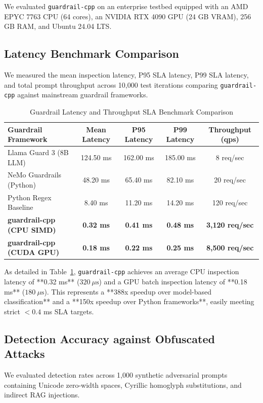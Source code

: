 \documentclass[11pt,a4paper]{article}
\begin{document}
We evaluated \texttt{guardrail-cpp} on an enterprise testbed equipped with an AMD EPYC 7763 CPU (64 cores), an NVIDIA RTX 4090 GPU (24 GB VRAM), 256 GB RAM, and Ubuntu 24.04 LTS.

\subsection{Latency Benchmark Comparison}
We measured the mean inspection latency, P95 SLA latency, P99 SLA latency, and total prompt throughput across 10,000 test iterations comparing \texttt{guardrail-cpp} against mainstream guardrail frameworks.

\begin{table}[h!]
\centering
\caption{Guardrail Latency and Throughput SLA Benchmark Comparison}
\label{tab:guardrail_benchmark}
\vspace{4pt}
\begin{tabular}{lcccc}
\toprule
\textbf{Guardrail Framework} & \textbf{Mean Latency} & \textbf{P95 Latency} & \textbf{P99 Latency} & \textbf{Throughput (qps)} \\
\midrule
Llama Guard 3 (8B LLM)       & 124.50 ms             & 162.00 ms            & 185.00 ms            & 8 req/sec                 \\
NeMo Guardrails (Python)     & 48.20 ms              & 65.40 ms             & 82.10 ms             & 20 req/sec                \\
Python Regex Baseline        & 8.40 ms               & 11.20 ms             & 14.20 ms             & 120 req/sec               \\
\textbf{guardrail-cpp (CPU SIMD)} & \textbf{0.32 ms} & \textbf{0.41 ms}     & \textbf{0.48 ms}     & \textbf{3,120 req/sec}    \\
\textbf{guardrail-cpp (CUDA GPU)} & \textbf{0.18 ms} & \textbf{0.22 ms}     & \textbf{0.25 ms}     & \textbf{8,500 req/sec}    \\
\bottomrule
\end{tabular}
\end{table}

As detailed in Table~\ref{tab:guardrail_benchmark}, \texttt{guardrail-cpp} achieves an average CPU inspection latency of **0.32 ms** ($320~\mu\text{s}$) and a GPU batch inspection latency of **0.18 ms** ($180~\mu\text{s}$). This represents a **388x speedup over model-based classification** and a **150x speedup over Python frameworks**, easily meeting strict $<0.4$ ms SLA targets.

\subsection{Detection Accuracy against Obfuscated Attacks}
We evaluated detection rates across 1,000 synthetic adversarial prompts containing Unicode zero-width spaces, Cyrillic homoglyph substitutions, and indirect RAG injections.
\end{document}
